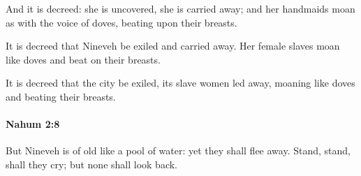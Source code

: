 			\begin{versebox}
					\item[BHS] 
					\item[LXX] 
					\item[ASV] And it is decreed: she is uncovered, she is carried away; and her handmaids moan as with the voice of doves, beating upon their breasts.
					\item[NIV] It is decreed that Nineveh be exiled and carried away. Her female slaves moan like doves and beat on their breasts.
					\item[NRSV] It is decreed that the city be exiled, its slave women led away, moaning like doves and beating their breasts.
			\end{versebox}

		\paragraph{Nahum 2:8} %
			\label{NAHUM-2-8}

			But Nineveh is of old like a pool of water: yet they shall flee away. Stand, stand, shall they cry; but none shall look back.

